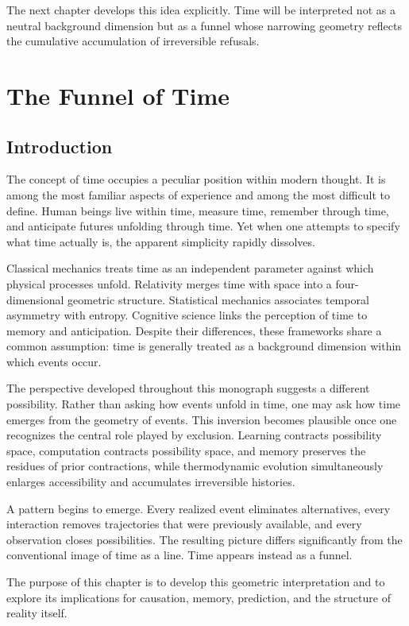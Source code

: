 \documentclass[11pt,oneside]{book}
\theoremstyle{plain}
\theoremstyle{definition}
\theoremstyle{remark}
\begin{document}
The next chapter develops this idea explicitly. Time will be interpreted not as a neutral background dimension but as a funnel whose narrowing geometry reflects the cumulative accumulation of irreversible refusals.

\chapter{The Funnel of Time}

\section{Introduction}

The concept of time occupies a peculiar position within modern thought. It is among the most familiar aspects of experience and among the most difficult to define. Human beings live within time, measure time, remember through time, and anticipate futures unfolding through time. Yet when one attempts to specify what time actually is, the apparent simplicity rapidly dissolves.

Classical mechanics treats time as an independent parameter against which physical processes unfold. Relativity merges time with space into a four-dimensional geometric structure. Statistical mechanics associates temporal asymmetry with entropy. Cognitive science links the perception of time to memory and anticipation. Despite their differences, these frameworks share a common assumption: time is generally treated as a background dimension within which events occur.

The perspective developed throughout this monograph suggests a different possibility. Rather than asking how events unfold in time, one may ask how time emerges from the geometry of events. This inversion becomes plausible once one recognizes the central role played by exclusion. Learning contracts possibility space, computation contracts possibility space, and memory preserves the residues of prior contractions, while thermodynamic evolution simultaneously enlarges accessibility and accumulates irreversible histories.

A pattern begins to emerge. Every realized event eliminates alternatives, every interaction removes trajectories that were previously available, and every observation closes possibilities. The resulting picture differs significantly from the conventional image of time as a line. Time appears instead as a funnel.

The purpose of this chapter is to develop this geometric interpretation and to explore its implications for causation, memory, prediction, and the structure of reality itself.
\end{document}
